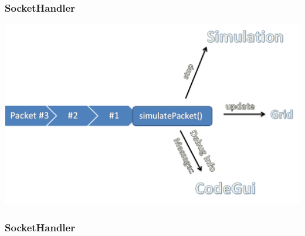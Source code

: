 \begin{frame}
\frametitle{SocketHandler}
	\includegraphics[scale=0.37]{client/socket-queue.png}
\end{frame}

\begin{frame}
\frametitle{SocketHandler}
\inputminted[linenos, numbersep=2pt, tabsize=4, frame=lines, label=Beispiel Paket]{json}{client/packet.json}
\end{frame}
